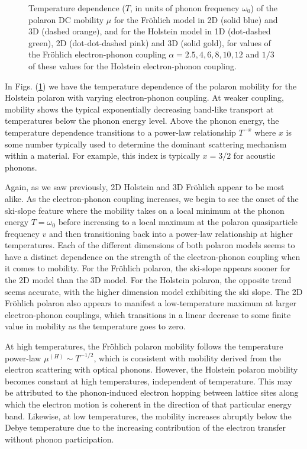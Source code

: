 \begin{figure}[!tbp]
    \caption{Temperature dependence ($T$, in units of phonon frequency $\omega_0$) of the polaron DC mobility $\mu$ for the Fr\"ohlich model in 2D (solid blue) and 3D (dashed orange), and for the Holstein model in 1D (dot-dashed green), 2D (dot-dot-dashed pink) and 3D (solid gold), for values of the Fr\"ohlich electron-phonon coupling $\alpha = 2.5, 4, 6, 8, 10, 12$ and $1/3$ of these values for the Holstein electron-phonon coupling.}
    \label{fig:mobility_temp}
\end{figure}
In Figs. (\ref{fig:mobility_temp}) we have the temperature dependence of the polaron mobility for the Holstein polaron with varying electron-phonon coupling. At weaker coupling, mobility shows the typical exponentially decreasing band-like transport at temperatures below the phonon energy level. Above the phonon energy, the temperature dependence transitions to a power-law relationship $T^{-x}$ where $x$ is some number typically used to determine the dominant scattering mechanism within a material. For example, this index is typically $x = 3/2$ for acoustic phonons. 

Again, as we saw previously, 2D Holstein and 3D Fr\"ohlich appear to be most alike. As the electron-phonon coupling increases, we begin to see the onset of the ski-slope feature where the mobility takes on a local minimum at the phonon energy $T = \omega_0$ before increasing to a local maximum at the polaron quasiparticle frequency $v$ and then transitioning back into a power-law relationship at higher temperatures. Each of the different dimensions of both polaron models seems to have a distinct dependence on the strength of the electron-phonon coupling when it comes to mobility. For the Fr\"ohlich polaron, the ski-slope appears sooner for the 2D model than the 3D model. For the Holstein polaron, the opposite trend seems accurate, with the higher dimension model exhibiting the ski slope. The 2D Fr\"ohlich polaron also appears to manifest a low-temperature maximum at larger electron-phonon couplings, which transitions in a linear decrease to some finite value in mobility as the temperature goes to zero.

At high temperatures, the Fr\"ohlich polaron mobility follows the temperature power-law $\mu^{(H)} \sim T^{-1/2}$, which is consistent with mobility derived from the electron scattering with optical phonons. However, the Holstein polaron mobility becomes constant at high temperatures, independent of temperature. This may be attributed to the phonon-induced electron hopping between lattice sites along which the electron motion is coherent in the direction of that particular energy band. Likewise, at low temperatures, the mobility increases abruptly below the Debye temperature due to the increasing contribution of the electron transfer without phonon participation.

